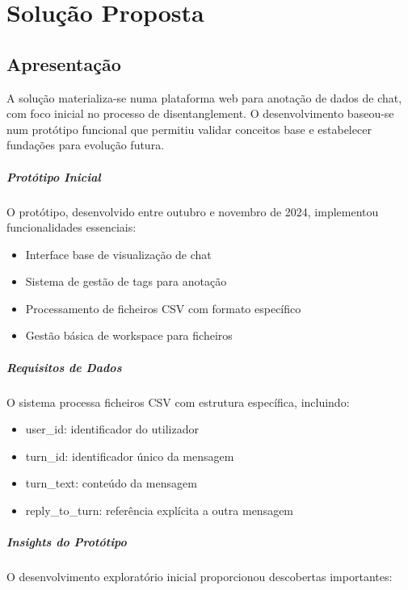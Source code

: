 \chapter{Solução Proposta}

\section{Apresentação}

A solução materializa-se numa plataforma web para anotação de dados de chat, com foco inicial no processo de disentanglement. O desenvolvimento baseou-se num protótipo funcional \cite{prototype} que permitiu validar conceitos base e estabelecer fundações para evolução futura.

\paragraph{Protótipo Inicial}
O protótipo, desenvolvido entre outubro e novembro de 2024, implementou funcionalidades essenciais:

\begin{itemize}
    \item Interface base de visualização de chat
    \item Sistema de gestão de tags para anotação
    \item Processamento de ficheiros CSV com formato específico
    \item Gestão básica de workspace para ficheiros
\end{itemize}

\paragraph{Requisitos de Dados}
O sistema processa ficheiros CSV com estrutura específica, incluindo:

\begin{itemize}
    \item user\_id: identificador do utilizador
    \item turn\_id: identificador único da mensagem
    \item turn\_text: conteúdo da mensagem
    \item reply\_to\_turn: referência explícita a outra mensagem
\end{itemize}

\paragraph{Insights do Protótipo}
O desenvolvimento exploratório inicial proporcionou descobertas importantes:

